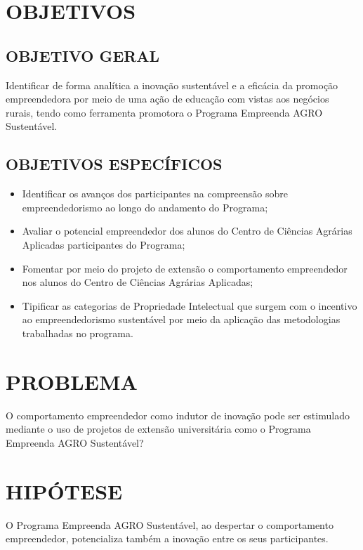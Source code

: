\section{OBJETIVOS}

\subsection{OBJETIVO GERAL}

Identificar de forma analítica a inovação sustentável e a eficácia da promoção empreendedora por meio de uma ação de educação com vistas aos negócios rurais, tendo como ferramenta promotora o Programa Empreenda AGRO Sustentável.

\subsection{OBJETIVOS ESPECÍFICOS}

\begin{itemize}
\item{Identificar os avanços dos participantes na compreensão sobre empreendedorismo ao longo do andamento do Programa;}
\item {Avaliar o potencial empreendedor dos alunos do Centro de Ciências Agrárias Aplicadas participantes do Programa;}
\item {Fomentar por meio do projeto de extensão o comportamento empreendedor nos alunos do Centro de Ciências Agrárias Aplicadas;}
\item {Tipificar as categorias de Propriedade Intelectual que surgem com o incentivo ao empreendedorismo sustentável por meio da aplicação das metodologias trabalhadas no programa.}
\end{itemize}

\section{PROBLEMA}

O comportamento empreendedor como indutor de inovação pode ser estimulado mediante o uso de projetos de extensão universitária como o Programa Empreenda AGRO Sustentável? 

\section{HIPÓTESE}

O Programa Empreenda AGRO Sustentável, ao despertar o comportamento empreendedor, potencializa também a inovação entre os seus participantes.



